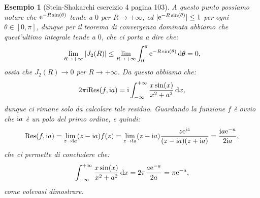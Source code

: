 \documentclass[11pt]{book}
\theoremstyle{Definizione}
\theoremstyle{TeoremaProposizioneLemmaCorollarioCongettura}
\theoremstyle{OsservazioneNotaEsempio}
\newtheorem{myes}{Esempio}[section]
\renewcommand{\i}{\textup{i}}
\newcommand{\e}{\textup{e}}
\renewcommand{\d}{\mathrm{d}}
\newcommand{\dx}{\,\d x}
\newcommand{\dtheta}{\, \d \theta}
\newcommand{\Res}{\textup{Res}}
\begin{document}
\begin{myes}[Stein-Shakarchi esercizio 4 pagina 103]
A questo punto possiamo notare che $\e^{-R\sin(\theta)}$ tende a $0$ per $R \to +\infty$, ed $|\e^{-R\sin(\theta)}|\leq 1$ per ogni $\theta\in [0,\pi]$, dunque per il teorema di convergenza dominata abbiamo che quest'ultimo integrale tende a $0$, che ci porta a dire che:
$$
\lim_{R \to +\infty} |J_2(R)| \leq \lim_{R \to +\infty} \int_0^{\pi} \e^{-R\sin(\theta)} \dtheta = 0,
$$
ossia che $J_2(R) \to 0$ per $R \to +\infty$. Da questo abbiamo che:
$$
2\pi\i \Res(f,\i a) = \i\int_{-\infty}^{+\infty} \frac{x\sin(x)}{x^2+a^2}\dx,
$$
dunque ci rimane solo da calcolare tale residuo. Guardando la funzione $f$ è ovvio che $\i a$ è un polo del primo ordine, e quindi:
$$
\Res(f,\i a) = \lim_{z\to \i a} (z-\i a) f(z) = \lim_{z\to \i a} (z-\i a)\frac{z \e^{\i z}}{(z-\i a)(z+\i a)} = \frac{\i a\e^{-a}}{2\i a},
$$
che ci permette di concludere che:
$$
\int_{-\infty}^{+\infty} \frac{x\sin(x)}{x^2+a^2}\dx = 2\pi \frac{a\e^{-a}}{2a} = \pi \e^{-a},
$$
come volevasi dimostrare.
\end{myes}
\end{document}
